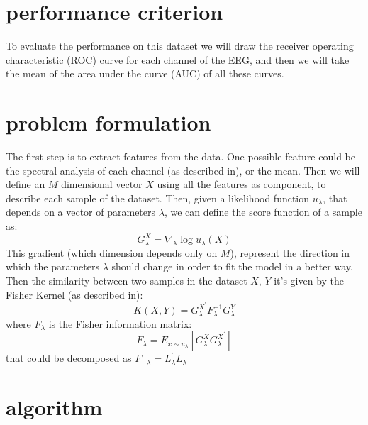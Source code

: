 \documentclass[final,leqno,onefignum,onetabnum]{siamltexmm}
\begin{document}
  \section{performance criterion}
  To evaluate the performance on this dataset we will draw the receiver operating characteristic (ROC) curve for each channel of the EEG, and then we will take the mean of the area under the curve (AUC) of all these curves. 


  \section{problem formulation}
  The first step is to extract features from the data. One possible feature could be the spectral analysis of each channel (as described in\cite{features1}), or the mean. Then we will define an $M$ dimensional vector $X$ using all the features as component, to describe each sample of the dataset. Then, given a likelihood function $u_\lambda$, that depends on  a vector of parameters $\lambda$, we can define the score function of a sample as:
  \begin{equation}\label{Glambda}
    G_\lambda^X=\nabla_{\lambda }\log u_\lambda(X)  
  \end{equation}
  This gradient (which dimension depends only on $M$), represent the direction in which the parameters $\lambda$ should change in order to fit the model in a better way.
  Then the similarity between two samples in the dataset $X$, $Y$ it's given by the Fisher Kernel (as described in\cite{fisher}):
  \begin{equation}
    K(X,Y)=G_\lambda^{X^{'}}F_\lambda^{-1} G_\lambda^Y
  \end{equation} 
  where $F_\lambda$ is the Fisher information matrix:
  \begin{equation}
    F_\lambda = E_{x \sim u_{\lambda}}[ G_{\lambda}^{X} G_{\lambda}^{X^{'}}]
  \end{equation} 
  that could be decomposed as $F_{-\lambda}=L_\lambda^{'}L_\lambda$


  \section{algorithm}
\end{document}
